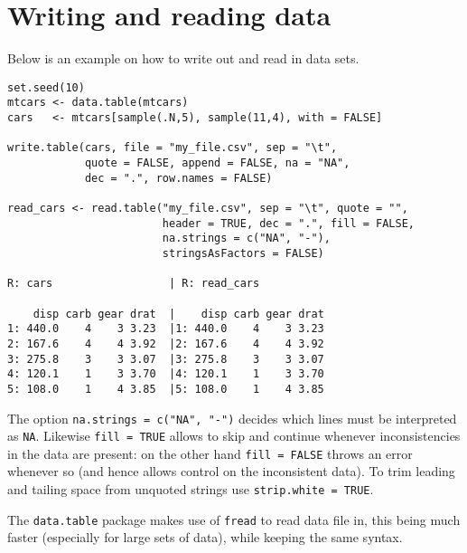 \chapter{Writing and reading data}\label{sec: read_write}
Below is an example on how to write out and read 
in data sets. 
\begin{verbatim}
set.seed(10)
mtcars <- data.table(mtcars)
cars   <- mtcars[sample(.N,5), sample(11,4), with = FALSE]

write.table(cars, file = "my_file.csv", sep = "\t", 
            quote = FALSE, append = FALSE, na = "NA", 
            dec = ".", row.names = FALSE)

read_cars <- read.table("my_file.csv", sep = "\t", quote = "",
                        header = TRUE, dec = ".", fill = FALSE, 
                        na.strings = c("NA", "-"), 
                        stringsAsFactors = FALSE)
                        
R: cars                  | R: read_cars

    disp carb gear drat  |    disp carb gear drat
1: 440.0    4    3 3.23  |1: 440.0    4    3 3.23
2: 167.6    4    4 3.92  |2: 167.6    4    4 3.92
3: 275.8    3    3 3.07  |3: 275.8    3    3 3.07
4: 120.1    1    3 3.70  |4: 120.1    1    3 3.70
5: 108.0    1    4 3.85  |5: 108.0    1    4 3.85        
\end{verbatim}
The option \texttt{na.strings = c("NA", "-")} decides
which lines must be interpreted as \texttt{NA}. 
Likewise \texttt{fill = TRUE} allows to skip and 
continue whenever inconsistencies in the data are
present: on the other hand \texttt{fill = FALSE} 
throws an error whenever so (and hence allows 
control on the inconsistent data). To trim leading 
and tailing space from unquoted strings use 
\texttt{strip.white = TRUE}.
\bigskip

The \texttt{data.table} package makes use of 
\texttt{fread} to read data file in, this being
much faster (especially for large sets of data),
while keeping the same syntax.
